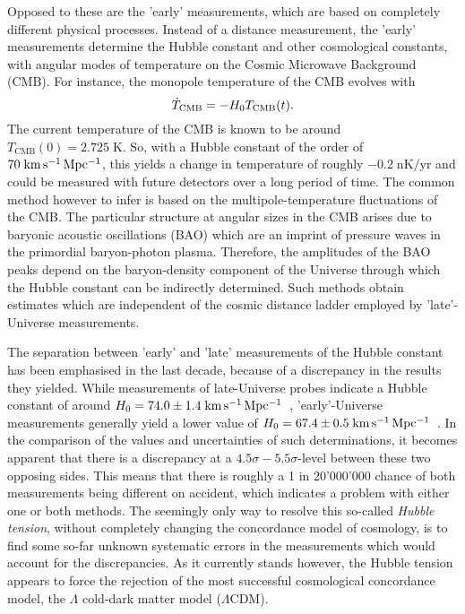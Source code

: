 Opposed to these are the 'early' measurements, which are based on completely
different physical processes.  Instead of a distance measurement, the 'early'
measurements determine the Hubble constant and other cosmological constants,
with angular modes of temperature on the Cosmic Microwave Background (CMB).  For
instance, the monopole temperature of the CMB evolves with
%
\begin{equation}
    \dot{T}_{\text{CMB}} = -H_{0}{}T_{\text{CMB}}(t).
\end{equation}
%
The current temperature of the CMB is known to be around $T_{\text{CMB}}(0) =
2.725\;\mathrm{K}$. So, with a Hubble constant of the order of
$70\;\mathrm{km\,s^{-1}\,Mpc^{-1}}{}$, this yields a change in temperature of roughly
$-0.2\;\mathrm{nK/yr}$ and could be measured with future detectors over a long
period of time.  The common method however to infer \Ho{} is based on the
multipole-temperature fluctuations of the CMB.  The particular structure at
angular sizes in the CMB arises due to baryonic acoustic oscillations (BAO)
which are an imprint of pressure waves in the primordial baryon-photon plasma.
Therefore, the amplitudes of the BAO peaks depend on the baryon-density
component of the Universe through which the Hubble constant can be indirectly
determined.  Such methods obtain estimates which are independent of the cosmic
distance ladder employed by 'late'-Universe measurements.

The separation between 'early' and 'late' measurements of the Hubble constant
has been emphasised in the last decade, because of a discrepancy in the results
they yielded.  While measurements of late-Universe probes indicate a Hubble
constant of around $H_{0} = 74.0 \pm 1.4\;\mathrm{km\,s^{-1}\,Mpc^{-1}}$~, 'early'-Universe
measurements generally yield a lower value of $H_{0} = 67.4 \pm
0.5\;\mathrm{km\,s^{-1}\,Mpc^{-1}}$~.  In the comparison of the
values and uncertainties of such determinations, it becomes apparent that there
is a discrepancy at a $4.5\sigma-5.5\sigma$-level between these two opposing sides.  This means
that there is roughly a 1 in 20'000'000 chance of both measurements being
different on accident, which indicates a problem with either one or both
methods.  The seemingly only way to resolve this so-called \textit{Hubble
tension}, without completely changing the concordance model of cosmology, is to
find some so-far unknown systematic errors in the measurements which would
account for the discrepancies.  As it currently stands however, the Hubble
tension appears to force the rejection of the most successful cosmological
concordance model, the $\Lambda$ cold-dark matter model ($\Lambda$CDM). 

